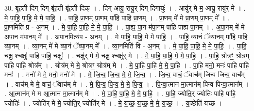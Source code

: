 \documentclass[17pt]{extarticle}
\begin{document}
30. बृ॒ह॒ती दिग् दिग् बृ॑ह॒ती बृ॑ह॒ती दिक् । . दिग् आयु॒ रायु॒र् दिग् दिगायुः॑ । . आयु॑र् मे म॒ आयु॒ रायु॑र् मे । . मे॒ पा॒हि॒ पा॒हि॒ मे॒ मे॒ पा॒हि॒ । . पा॒हि॒ प्रा॒णम् प्रा॒णम् पा॑हि पाहि प्रा॒णम् । . प्रा॒णम् मे॑ मे प्रा॒णम् प्रा॒णम् मे᳚ । . प्रा॒णमिति॑ प्र - अ॒नम् । . मे॒ पा॒हि॒ पा॒हि॒ मे॒ मे॒ पा॒हि॒ । . पा॒ह्य॒ पा॒न म॑पा॒नम् पा॑हि पाह्य पा॒नम् । . अ॒पा॒नम् मे॑ मे अपा॒न म॑पा॒नम् मे᳚ । . अ॒पा॒नमित्य॑प - अ॒नम् । . मे॒ पा॒हि॒ पा॒हि॒ मे॒ मे॒ पा॒हि॒ । . पा॒हि॒ व्या॒नं ॅव्या॒नम् पा॑हि पाहि व्या॒नम् । . व्या॒नम् मे॑ मे व्या॒नं ॅव्या॒नम् मे᳚ । . व्या॒नमिति॑ वि - अ॒नम् । . मे॒ पा॒हि॒ पा॒हि॒ मे॒ मे॒ पा॒हि॒ । . पा॒हि॒ चक्षु॒ श्चक्षुः॑ पाहि पाहि॒ चक्षुः॑ । . चक्षु॑र् मे मे॒ चक्षु॒ श्चक्षु॑र् मे । . मे॒ पा॒हि॒ पा॒हि॒ मे॒ मे॒ पा॒हि॒ । . पा॒हि॒ श्रोत्रꣳ॒॒ श्रोत्र॑म् पाहि पाहि॒ श्रोत्र᳚म् । . श्रोत्र॑म् मे मे॒ श्रोत्रꣳ॒॒ श्रोत्र॑म् मे । . मे॒ पा॒हि॒ पा॒हि॒ मे॒ मे॒ पा॒हि॒ । . पा॒हि॒ मनो॒ मनः॑ पाहि पाहि॒ मनः॑ । . मनो॑ मे मे॒ मनो॒ मनो॑ मे । . मे॒ जि॒न्व॒ जि॒न्व॒ मे॒ मे॒ जि॒न्व॒ । . जि॒न्व॒ वाचं॒ ॅवाच॑म् जिन्व जिन्व॒ वाच᳚म् । . वाच॑म् मे मे॒ वाचं॒ ॅवाच॑म् मे । . मे॒ पि॒न्व॒ पि॒न्व॒ मे॒ मे॒ पि॒न्व॒ । . पि॒न्वा॒त्मान॑ मा॒त्मान॑म् पिन्व पिन्वा॒त्मान᳚म् । . आ॒त्मान॑म् मे म आ॒त्मान॑ मा॒त्मान॑म् मे । . मे॒ पा॒हि॒ पा॒हि॒ मे॒ मे॒ पा॒हि॒ । . पा॒हि॒ ज्योति॒र् ज्योतिः॑ पाहि पाहि॒ ज्योतिः॑ । . ज्योति॑र् मे मे॒ ज्योति॒र् ज्योति॑र् मे । . मे॒ य॒च्छ॒ य॒च्छ॒ मे॒ मे॒ य॒च्छ॒ । . य॒च्छेति॑ यच्छ । \newline
\end{document}
